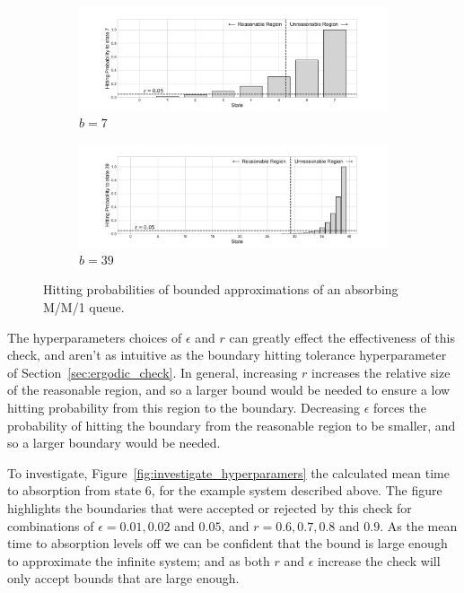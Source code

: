\documentclass{article}
\begin{document}
\begin{figure}[!htbp]
  \begin{center}
  \begin{subfigure}[b]{0.65\textwidth}
    \includegraphics[width=\textwidth]{img/example_absorbingmc_8states.pdf}
    \caption{$b=7$}
    \label{fig:absorbing_b7}
  \end{subfigure}
  \begin{subfigure}[b]{0.65\textwidth}
    \includegraphics[width=\textwidth]{img/example_absorbingmc_40states.pdf}
    \caption{$b=39$}
    \label{fig:absorbing_b39}
  \end{subfigure}
  \end{center}
  \caption{Hitting probabilities of bounded approximations of an absorbing M/M/1 queue.}
  \label{fig:absorbing_check}
\end{figure}

The hyperparameters choices of $\epsilon$ and $r$ can greatly effect the
effectiveness of this check, and aren't as intuitive as the boundary hitting
tolerance hyperparameter of Section~\ref{sec:ergodic_check}. In general,
increasing $r$ increases the relative size of the reasonable region, and so a
larger bound would be needed to ensure a low hitting probability from this
region to the boundary. Decreasing $\epsilon$ forces the probability of hitting
the boundary from the reasonable region to be smaller, and so a larger boundary
would be needed.

To investigate, Figure~\ref{fig:investigate_hyperparamers} the calculated mean
time to absorption from state 6, for the example system described above.
The figure highlights the boundaries that were accepted or rejected by this
check for combinations of $\epsilon = 0.01, 0.02$ and $0.05$, and
$r = 0.6, 0.7, 0.8$ and $0.9$.
As the mean time to absorption levels off we can be confident that the bound is
large enough to approximate the infinite system; and as both $r$ and $\epsilon$
increase the check will only accept bounds that are large enough.
\end{document}
